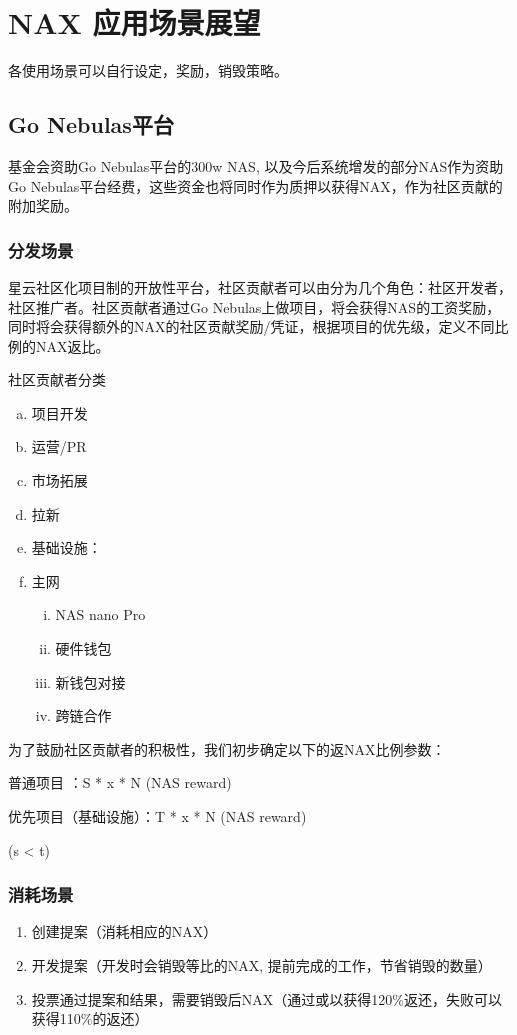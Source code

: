 \section{NAX 应用场景展望}

各使用场景可以自行设定，奖励，销毁策略。

\subsection{Go Nebulas平台}

基金会资助Go Nebulas平台的300w NAS, 以及今后系统增发的部分NAS作为资助Go Nebulas平台经费，这些资金也将同时作为质押以获得NAX，作为社区贡献的附加奖励。

\subsubsection{分发场景}

星云社区化项目制的开放性平台，社区贡献者可以由分为几个角色：社区开发者，社区推广者。社区贡献者通过Go Nebulas上做项目，将会获得NAS的工资奖励， 同时将会获得额外的NAX的社区贡献奖励/凭证，根据项目的优先级，定义不同比例的NAX返比。

社区贡献者分类

\begin{enumerate}[a.]
  \item 项目开发
  \item 运营/PR
  \item 市场拓展
  \item 拉新
  \item 基础设施：
  \item 主网
\begin{enumerate}[i.]
  \item NAS nano Pro
  \item 硬件钱包
  \item 新钱包对接
  \item 跨链合作
\end{enumerate}
\end{enumerate}

为了鼓励社区贡献者的积极性，我们初步确定以下的返NAX比例参数：

普通项目 ：S * x * N (NAS reward)

优先项目（基础设施）：T * x * N (NAS reward)

(s < t)

\subsubsection{消耗场景}
\begin{enumerate}
\item 创建提案（消耗相应的NAX）
\item 开发提案（开发时会销毁等比的NAX, 提前完成的工作，节省销毁的数量）
\item 投票通过提案和结果，需要销毁后NAX（通过或以获得120\%返还，失败可以获得110\%的返还）
\end{enumerate}


